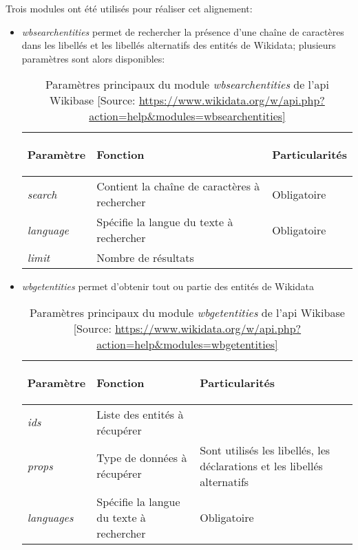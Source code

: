 Trois modules ont été utilisés pour réaliser cet alignement:
\begin{itemize}
	\item \textit{wbsearchentities} permet de rechercher la présence d'une chaîne de caractères dans les libellés et les libellés alternatifs des entités de Wikidata; plusieurs paramètres sont alors disponibles:
	\begin{table}
		\centering
		\begin{tabularx}{15cm}{|X|X|X|}
			\hline
			\begin{center}Paramètre\end{center}&\begin{center}Fonction\end{center}&\begin{center}Particularités\end{center}  \tabularnewline \hline
			\textit{search}&Contient la chaîne de caractères à rechercher&Obligatoire\tabularnewline \hline
			\textit{language}&Spécifie la langue du texte à rechercher&Obligatoire\tabularnewline \hline
			\textit{limit}&Nombre de résultats&\tabularnewline \hline
		\end{tabularx}
	\caption[Paramètres principaux du module \textit{wbsearchentities} de l'\ac{api} Wikibase]{Paramètres principaux du module \textit{wbsearchentities} de l'\ac{api} Wikibase [Source: \url{https://www.wikidata.org/w/api.php?action=help\&modules=wbsearchentities]}}
	\label{wbsearchentities}
	\end{table}
	\item \textit{wbgetentities} permet d'obtenir tout ou partie des entités de Wikidata
	\begin{table}
		\centering
		\begin{tabularx}{15cm}{|X|X|X|}
			\hline
			\begin{center}Paramètre\end{center}&\begin{center}Fonction\end{center}&\begin{center}Particularités\end{center}  \tabularnewline \hline
			\textit{ids}&Liste des entités à récupérer&\tabularnewline \hline
			\textit{props}&Type de données à récupérer&Sont utilisés les libellés, les déclarations et les libellés alternatifs\tabularnewline \hline
			\textit{languages}&Spécifie la langue du texte à rechercher&Obligatoire\tabularnewline \hline
		\end{tabularx}
		\caption[Paramètres principaux du module \textit{wbgetentities} de l'\ac{api} Wikibase]{Paramètres principaux du module \textit{wbgetentities} de l'\ac{api} Wikibase [Source: \url{https://www.wikidata.org/w/api.php?action=help\&modules=wbgetentities]}}

\end{table}
\end{itemize}
